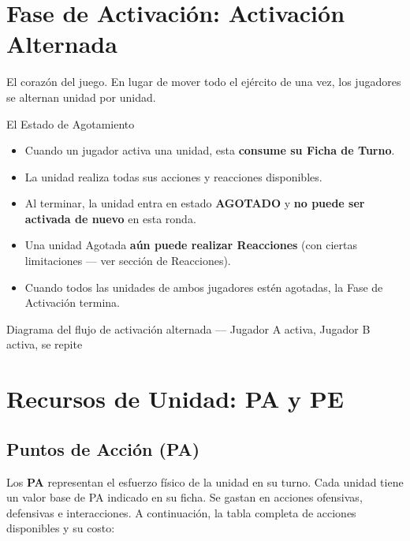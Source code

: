 \section{Fase de Activación: Activación Alternada}

El corazón del juego. En lugar de mover todo el ejército de una vez, los jugadores se alternan unidad por unidad.

\begin{reglaespecial}{El Estado de Agotamiento}
\begin{itemize}
    \item Cuando un jugador activa una unidad, esta \textbf{consume su Ficha de Turno}.
    \item La unidad realiza todas sus acciones y reacciones disponibles.
    \item Al terminar, la unidad entra en estado \textbf{AGOTADO} y \textbf{no puede ser activada de nuevo} en esta ronda.
    \item Una unidad Agotada \textbf{aún puede realizar Reacciones} (con ciertas limitaciones — ver sección de Reacciones).
    \item Cuando todos las unidades de ambos jugadores estén agotadas, la Fase de Activación termina.
\end{itemize}
\end{reglaespecial}

\begin{imagebox}{Diagrama del flujo de activación alternada — Jugador A activa, Jugador B activa, se repite}
    \vspace{2.5cm}
\end{imagebox}

\section{Recursos de Unidad: PA y PE}

\subsection{Puntos de Acción (PA)}

Los \textbf{PA} representan el esfuerzo físico de la unidad en su turno. Cada unidad tiene un valor base de PA indicado en su ficha. Se gastan en acciones ofensivas, defensivas e interacciones. A continuación, la tabla completa de acciones disponibles y su costo:

